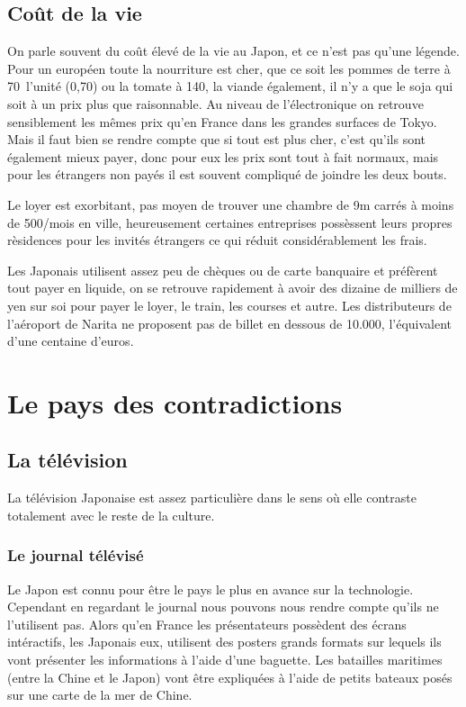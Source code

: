 \documentclass[journal]{RapportFR}
\begin{document}
\begin{CJK*}{UTF8}{min}
\subsection{Co\^ut de la vie}

On parle souvent du co\^ut \'elev\'e de la vie au Japon, et ce n'est pas qu'une l\'egende. Pour un europ\'een toute la nourriture est cher, que ce soit les pommes de terre \`a 70\textyen~l'unit\'e (0,70\texteuro) ou la tomate \`a 140\textyen, la viande \'egalement, il n'y a que le soja qui soit \`a un prix plus que raisonnable. Au niveau de l'\'electronique on retrouve sensiblement les m\^emes prix qu'en France dans les grandes surfaces de Tokyo. Mais il faut bien se rendre compte que si tout est plus cher, c'est qu'ils sont \'egalement mieux payer, donc pour eux les prix sont tout \`a fait normaux, mais pour les \'etrangers non pay\'es il est souvent compliqu\'e de joindre les deux bouts.

Le loyer est exorbitant, pas moyen de trouver une chambre de 9m carr\'es \`a moins de 500\texteuro/mois en ville, heureusement certaines entreprises poss\`essent leurs propres r\`esidences pour les invit\'es \'etrangers ce qui r\'eduit consid\'erablement les frais.

Les Japonais utilisent assez peu de ch\`eques ou de carte banquaire et pr\'ef\`erent tout payer en liquide, on se retrouve rapidement \`a avoir des dizaine de milliers de yen sur soi pour payer le loyer, le train, les courses et autre. Les distributeurs de l'a\'eroport de Narita ne proposent pas de billet en dessous de 10.000\textyen, l'\'equivalent d'une centaine d'euros.

\section{Le pays des contradictions}

\subsection{La t\'el\'evision}

La t\'el\'evision Japonaise est assez particuli\`ere dans le sens o\`u elle contraste totalement avec le reste de la culture.

\subsubsection{Le journal t\'el\'evis\'e}

Le Japon est connu pour \^etre le pays le plus en avance sur la technologie. Cependant en regardant le journal nous pouvons nous rendre compte qu'ils ne l'utilisent pas. Alors qu'en France les pr\'esentateurs poss\`edent des \'ecrans int\'eractifs, les Japonais eux, utilisent des posters grands formats sur lequels ils vont pr\'esenter les informations \`a l'aide d'une baguette.
Les batailles maritimes (entre la Chine et le Japon) vont \^etre expliqu\'ees \`a l'aide de petits bateaux pos\'es sur une carte de la mer de Chine.


\end{CJK*}
\end{document}
